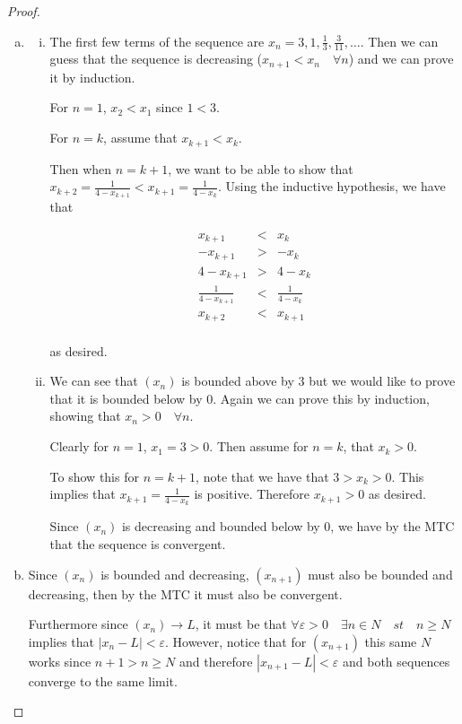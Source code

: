 \documentclass{tufte-book}
\theoremstyle{definition}
\numberwithin{section}{chapter}
\begin{document}
		\begin{proof}
			\begin{enumerate}[(a)]
				\item  
				\begin{enumerate}[(i)]
					\item The first few terms of the sequence are $x_n = 3, 1, \frac{1}{3}, \frac{3}{11}, \ldots$.  Then we can guess that the sequence is decreasing ($x_{n+1}< x_{n} \quad \forall n$)  and we can prove it by induction.
				
				For $n=1$,  $x_{2}< x_{1}$ since $1 <3$.
				
				For $n=k$, assume that $x_{k+1} < x_{k}$.
				
				Then when $n=k+1$, we want to be able to show that $x_{k+2} =\frac{1}{4-x_{k+1}} < x_{k+1} = \frac{1}{4-x_{k}}  $.   Using the inductive hypothesis, we have that
				
				
				\begin{eqnarray*}
x_{k+1}  &< & x_{k} \\
   	-x_{k+1}  &>& -x_{k} \\
 4-x_{k+1}  &>&4 -x_{k}\\
    \frac{1}{4-x_{k+1}}  &<&\frac{1}{4 -x_{k}}\\
   x_{k+2}  &< & x_{k+1} \\
\end{eqnarray*}

as desired.
				\item We can see that $(x_n)$ is bounded above by $3$ but we would like to prove that it is bounded below by $0$.  Again we can prove this by induction, showing that $x_n > 0 \quad \forall n$.
				
				Clearly for $n=1$, $x_1 = 3 >0$.
				Then assume for $n=k$, that $x_k >0$.
				
				To show this for $n = k+1$, note that we have that $3>x_k>0$.  This implies that $x_{k+1} = \frac{1}{4-x_k}$  is positive.  Therefore $x_{k+1}>0$ as desired.
				
				
				Since $(x_n)$ is decreasing and bounded below by $0$, we have by the MTC that the sequence is convergent.
				
								\end{enumerate}
				
				\item Since $ (x_n)$ is bounded and decreasing, $(x_{n+1})$ must also be bounded and decreasing, then by the MTC it must also be convergent.
				
				Furthermore since $(x_n) \to L$, it must be that $\forall \varepsilon >0 \quad \exists n \in N \quad st \quad n \geq N$ implies that $|x_n - L| <\varepsilon$.  However, notice that for $(x_{n+1})$ this same $N$ works since $n+1> n \geq N$ and therefore $|x_{n+1} - L| <\varepsilon$ and both sequences converge to the same limit.
				

\end{enumerate}
\end{proof}
\end{document}
